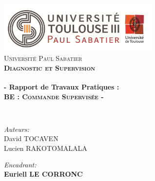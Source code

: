 
\begin{titlepage}
\begin{center}


\includegraphics[width=0.60\textwidth]{./page_de_garde/logo_ups.png}~\\[1cm]

\textsc{\LARGE Université Paul Sabatier}\\[1.5cm]

\textsc{\Large \bf Diagnostic et Supervision }\\[0.5cm]

\HRule \\[0.4cm]

{\huge \bfseries  - Rapport de Travaux Pratiques :\\ \textsc{BE : Commande Supervisée} -}

\HRule \\[1.5cm]

\begin{minipage}{0.4\textwidth}
\begin{flushleft} \large
\emph{Auteurs: }\\
David \textsc{TOCAVEN}\\
Lucien \textsc{RAKOTOMALALA}\\
\end{flushleft}
\end{minipage}
\begin{minipage}{0.58\textwidth}
\begin{flushright} \large
\emph{Encadrant:} \\
\textbf{Euriell \textsc{LE CORRONC}}
\end{flushright}
\end{minipage}
\newline
\newline


\end{center}
\end{titlepage}
